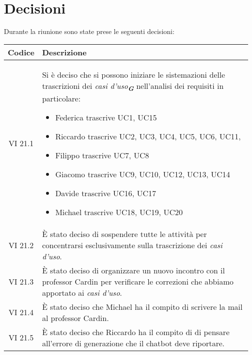 
\section{Decisioni}

Durante la riunione sono state prese le seguenti decisioni:

\vspace{0.5cm}

\begin{table}[htbp]
    \centering
    \begin{tabular}{|c|p{}|}
        \hline
        \rowcolor[gray]{0.75}
        \textbf{Codice} & \textbf{Descrizione}\\
        \hline
        VI 21.1 & Si è deciso che si possono iniziare le sistemazioni delle trascrizioni dei \emph{casi d'uso}\textsubscript{\textit{\textbf{G}}} nell'analisi dei requisiti in particolare: 
        \begin{itemize}
            \item Federica trascrive UC1, UC15
            \item Riccardo trascrive UC2, UC3, UC4, UC5, UC6, UC11, 
            \item Filippo trascrive UC7, UC8
            \item Giacomo trascrive UC9, UC10, UC12, UC13, UC14
            \item Davide trascrive UC16, UC17
            \item Michael trascrive UC18, UC19, UC20
        \end{itemize} \\
        \hline
        VI 21.2 & È stato deciso di sospendere tutte le attività per concentrarsi esclusivamente sulla trascrizione dei \emph{casi d'uso}. \\
        \hline
        VI 21.3 & È stato deciso di organizzare un nuovo incontro con il professor Cardin per verificare le correzioni che abbiamo apportato ai \emph{casi d'uso}.\\
        \hline
        VI 21.4 & È stato deciso che Michael ha il compito di scrivere la mail al professor Cardin.\\
        \hline
        VI 21.5 & È stato deciso che Riccardo ha il compito di di pensare all'errore di generazione che il chatbot deve riportare.\\

\end{tabular}
\end{table}
